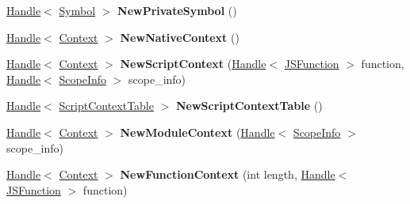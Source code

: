 \begin{DoxyCompactItemize}
\item 
\hyperlink{classv8_1_1internal_1_1_handle}{Handle}$<$ \hyperlink{classv8_1_1internal_1_1_symbol}{Symbol} $>$ {\bfseries New\+Private\+Symbol} ()\hypertarget{classv8_1_1internal_1_1_factory_ac7d7a146cc187518556e6cbd0a334a95}{}\label{classv8_1_1internal_1_1_factory_ac7d7a146cc187518556e6cbd0a334a95}

\item 
\hyperlink{classv8_1_1internal_1_1_handle}{Handle}$<$ \hyperlink{classv8_1_1internal_1_1_context}{Context} $>$ {\bfseries New\+Native\+Context} ()\hypertarget{classv8_1_1internal_1_1_factory_ab9690b8f7b4e296e2d397498ce264157}{}\label{classv8_1_1internal_1_1_factory_ab9690b8f7b4e296e2d397498ce264157}

\item 
\hyperlink{classv8_1_1internal_1_1_handle}{Handle}$<$ \hyperlink{classv8_1_1internal_1_1_context}{Context} $>$ {\bfseries New\+Script\+Context} (\hyperlink{classv8_1_1internal_1_1_handle}{Handle}$<$ \hyperlink{classv8_1_1internal_1_1_j_s_function}{J\+S\+Function} $>$ function, \hyperlink{classv8_1_1internal_1_1_handle}{Handle}$<$ \hyperlink{classv8_1_1internal_1_1_scope_info}{Scope\+Info} $>$ scope\+\_\+info)\hypertarget{classv8_1_1internal_1_1_factory_a1a0a4fdfcecb0f73909ac4480ccf178d}{}\label{classv8_1_1internal_1_1_factory_a1a0a4fdfcecb0f73909ac4480ccf178d}

\item 
\hyperlink{classv8_1_1internal_1_1_handle}{Handle}$<$ \hyperlink{classv8_1_1internal_1_1_script_context_table}{Script\+Context\+Table} $>$ {\bfseries New\+Script\+Context\+Table} ()\hypertarget{classv8_1_1internal_1_1_factory_a9a2fe62fe0e107ba45a3896ee4d87511}{}\label{classv8_1_1internal_1_1_factory_a9a2fe62fe0e107ba45a3896ee4d87511}

\item 
\hyperlink{classv8_1_1internal_1_1_handle}{Handle}$<$ \hyperlink{classv8_1_1internal_1_1_context}{Context} $>$ {\bfseries New\+Module\+Context} (\hyperlink{classv8_1_1internal_1_1_handle}{Handle}$<$ \hyperlink{classv8_1_1internal_1_1_scope_info}{Scope\+Info} $>$ scope\+\_\+info)\hypertarget{classv8_1_1internal_1_1_factory_a296e5b6e75a980eb5773243df0420478}{}\label{classv8_1_1internal_1_1_factory_a296e5b6e75a980eb5773243df0420478}

\item 
\hyperlink{classv8_1_1internal_1_1_handle}{Handle}$<$ \hyperlink{classv8_1_1internal_1_1_context}{Context} $>$ {\bfseries New\+Function\+Context} (int length, \hyperlink{classv8_1_1internal_1_1_handle}{Handle}$<$ \hyperlink{classv8_1_1internal_1_1_j_s_function}{J\+S\+Function} $>$ function)\hypertarget{classv8_1_1internal_1_1_factory_ad84a59c4638a017e9d18f0f19e4dc950}{}\label{classv8_1_1internal_1_1_factory_ad84a59c4638a017e9d18f0f19e4dc950}


\end{DoxyCompactItemize}
